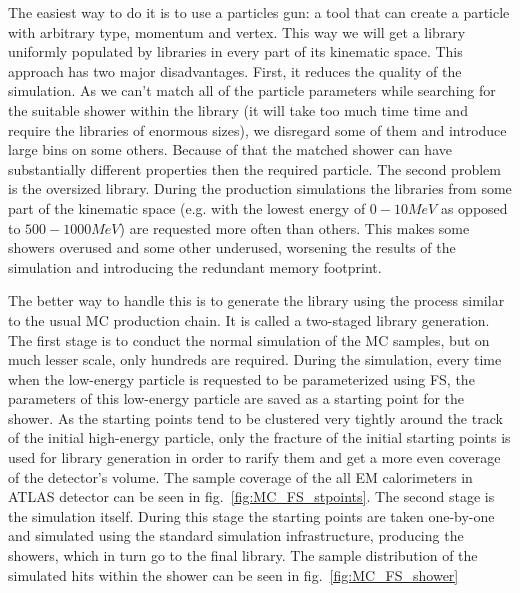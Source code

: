 The easiest way to do it is to use a particles gun: a tool that can create a particle with arbitrary type, momentum and vertex. This way we will get a library uniformly populated by libraries in every part of its kinematic space. This approach has two major disadvantages. First, it reduces the quality of the simulation. As we can't match all of the particle parameters while searching for the suitable shower within the library (it will take too much time time and require the libraries of enormous sizes), we disregard some of them and introduce large bins on some others. Because of that the matched shower can have substantially different properties then the required particle. The second problem is the oversized library. During the production simulations the libraries from some part of the kinematic space (e.g. with the lowest energy of $0-10 MeV$ as opposed to $500-1000 MeV$) are requested more often than others. This makes some showers overused and some other underused, worsening the results of the simulation and introducing the redundant memory footprint.

The better way to handle this is to generate the library using the process similar to the usual MC production chain. It is called a two-staged library generation. The first stage is to conduct the normal simulation of the MC samples, but on much lesser scale, only hundreds are required. During the simulation, every time when the low-energy particle is requested to be parameterized using FS, the parameters of this low-energy particle are saved as a starting point for the shower. As the starting points tend to be clustered very tightly around the track of the initial high-energy particle, only the fracture of the initial starting points is used for library generation in order to rarify them and get a more even coverage of the detector's volume. The sample coverage of the all EM calorimeters in ATLAS detector can be seen in fig.~\ref{fig:MC_FS_stpoints}. The second stage is the simulation itself. During this stage the starting points are taken one-by-one and simulated using the standard simulation infrastructure, producing the showers, which in turn go to the final library. The sample distribution of the simulated hits within the shower can be seen in fig.~\ref{fig:MC_FS_shower}

